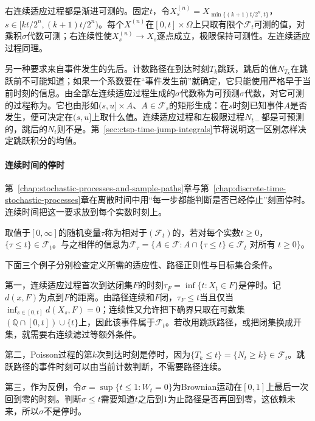 右连续适应过程都是渐进可测的。固定$t$，令$X^{(n)}_s=X_{\min\{(k+1)t/2^n,t\}}$，$s\in[kt/2^n,(k+1)t/2^n)$。每个$X^{(n)}$在$[0,t]\times\Omega$上只取有限个$\mathcal F_t$可测的值，对乘积$\sigma$代数可测；右连续性使$X^{(n)}_s\to X_s$逐点成立，极限保持可测性。左连续适应过程同理。

另一种要求来自事件发生的先后。计数路径在到达时刻$T_k$跳跃，跳后的值$N_{T_k}$在跳跃前不可能知道；如果一个系数要在“事件发生前”就确定，它只能使用严格早于当前时刻的信息。由全部左连续适应过程生成的$\sigma$代数称为可预测$\sigma$代数，对它可测的过程称为。它也由形如$(s,u]\times A$、$A\in\mathcal F_s$的矩形生成：在$s$时刻已知事件$A$是否发生，便可决定在$(s,u]$上取什么值。连续适应过程和左极限过程$N_{t-}$都是可预测的，跳后的$N_t$则不是。第~\ref{sec:ctsp-time-jump-integrals}节将说明这一区别怎样决定跳跃积分的均值。

\paragraph{连续时间的停时}
第~\ref{chap:stochastic-processes-and-sample-paths}章与第~\ref{chap:discrete-time-stochastic-processes}章在离散时间中用“每一步都能判断是否已经停止”刻画停时。连续时间把这一要求放到每个实数时刻上。

\begin{definition}[连续时间停时]
  \label{def:ctsp-stopping-time}
  取值于$[0,\infty]$的随机变量$\tau$称为相对于$(\mathcal F_t)$的，若对每个实数$t\geq0$，$\{\tau\leq t\}\in\mathcal F_t$。与之相伴的信息为$\mathcal F_\tau=\{A\in\mathcal F:A\cap\{\tau\leq t\}\in\mathcal F_t\text{ 对所有 }t\geq0\}$。
\end{definition}

下面三个例子分别检查定义所需的适应性、路径正则性与目标集合条件。

第一，连续适应过程首次到达闭集$F$的时刻$\tau_F=\inf\{t:X_t\in F\}$是停时。记$d(x,F)$为点到$F$的距离。由路径连续和$F$闭，$\tau_F\leq t$当且仅当$\inf_{s\in[0,t]}d(X_s,F)=0$；连续性又允许把下确界只取在可数集$(\mathbb Q\cap[0,t])\cup\{t\}$上，因此该事件属于$\mathcal F_t$。若改用跳跃路径，或把闭集换成开集，就需要右连续滤过等额外条件。

第二，Poisson过程的第$k$次到达时刻是停时，因为$\{T_k\leq t\}=\{N_t\geq k\}\in\mathcal F_t$。跳跃路径的事件时刻可以由当前计数判断，不需要路径连续。

第三，作为反例，令$\sigma=\sup\{t\leq1:W_t=0\}$为Brownian运动在$[0,1]$上最后一次回到零的时刻。判断$\sigma\leq t$需要知道$t$之后到$1$为止路径是否再回到零，这依赖未来，所以$\sigma$不是停时。

